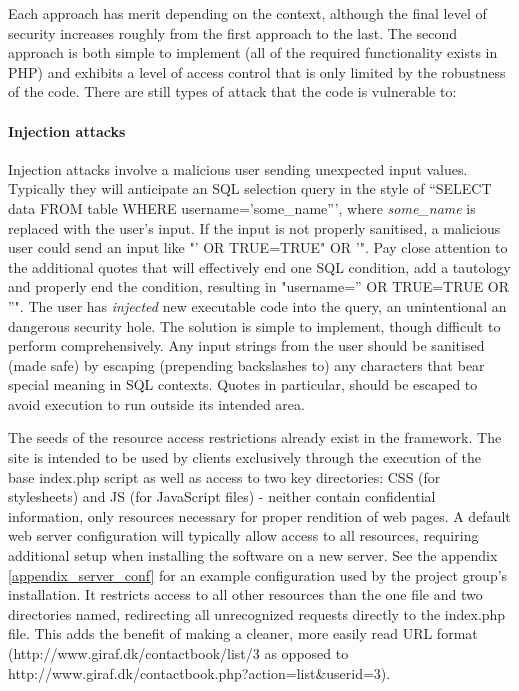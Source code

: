 Each approach has merit depending on the context, although the final level of security increases roughly from the first approach to the last. The second approach is both simple to implement (all of the required functionality exists in PHP) and exhibits a level of access control that is only limited by the robustness of the code. There are still types of attack that the code is vulnerable to:

\paragraph*{Injection attacks}
Injection attacks involve a malicious user sending unexpected input values. Typically they will anticipate an SQL selection query in the style of ``SELECT data FROM table WHERE username='some\_name''', where \emph{some\_name} is replaced with the user's input. If the input is not properly sanitised, a malicious user could send an input like "' OR TRUE=TRUE" OR '". Pay close attention to the additional quotes that will effectively end one SQL condition, add a tautology and properly end the condition, resulting in "username='' OR TRUE=TRUE OR ''". The user has \emph{injected} new executable code into the query, an unintentional an dangerous security hole. The solution is simple to implement, though difficult to perform comprehensively. Any input strings from the user should be sanitised (made safe) by escaping (prepending backslashes to) any characters that bear special meaning in SQL contexts. Quotes in particular, should be escaped to avoid execution to run outside its intended area.

The seeds of the resource access restrictions already exist in the framework. The site is intended to be used by clients exclusively through the execution of the base index.php script as well as access to two key directories: CSS (for stylesheets) and JS (for JavaScript files) - neither contain confidential information, only resources necessary for proper rendition of web pages. A default web server configuration will typically allow access to all resources, requiring additional setup when installing the software on a new server. See the appendix \vref{appendix_server_conf} for an example configuration used by the project group's installation. It restricts access to all other resources than the one file and two directories named, redirecting all unrecognized requests directly to the index.php file. This adds the benefit of making a cleaner, more easily read URL format (http://www.giraf.dk/contactbook/list/3 as opposed to http://www.giraf.dk/contactbook.php?action=list\&userid=3).


